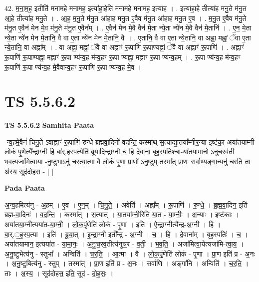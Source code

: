 \documentclass[17pt]{extarticle}
\begin{document}
42. म॒ना॒म॒ह॒ इतीति॑ मनामहे मनामह॒ इत्या॑हा॒हेति॑ मनामहे मनामह॒ इत्या॑ह । . इत्या॑हा॒हे तीत्या॑ह मनु॒ते म॑नु॒त आ॒हे तीत्या॑ह मनु॒ते । . आ॒ह॒ म॒नु॒ते म॑नु॒त आ॑हाह मनु॒त ए॒वैव म॑नु॒त आ॑हाह मनु॒त ए॒व । . म॒नु॒त ए॒वैव म॑नु॒ते म॑नु॒त ए॒वैन॑ मेन मे॒व म॑नु॒ते म॑नु॒त ए॒वैन᳚म् । . ए॒वैन॑ मेन मे॒वै वैन॑ मे॒ता न्ये॒ता न्ये॑न मे॒वै वैन॑ मे॒तानि॑ । . ए॒न॒ मे॒ता न्ये॒ता न्ये॑न मेन मे॒तानि॒ वै वा ए॒ता न्ये॑न मेन मे॒तानि॒ वै । . ए॒तानि॒ वै वा ए॒ता न्ये॒तानि॒ वा अह्ना॒ मह्नां॒ ॅवा ए॒ता न्ये॒तानि॒ वा अह्ना᳚म् । . वा अह्ना॒ मह्नां॒ ॅवै वा अह्नाꣳ॑ रू॒पाणि॑ रू॒पाण्यह्नां॒ ॅवै वा अह्नाꣳ॑ रू॒पाणि॑ । . अह्नाꣳ॑ रू॒पाणि॑ रू॒पाण्यह्ना॒ मह्नाꣳ॑ रू॒पा ण्य॑न्व॒ह म॑न्व॒हꣳ रू॒पा ण्यह्ना॒ मह्नाꣳ॑ रू॒पा ण्य॑न्व॒हम् । . रू॒पा ण्य॑न्व॒ह म॑न्व॒हꣳ रू॒पाणि॑ रू॒पा ण्य॑न्व॒ह मे॒वैवान्व॒हꣳ रू॒पाणि॑ रू॒पा ण्य॑न्व॒ह मे॒व । \newline
\pagebreak
{}

\section{ TS 5.5.6.2 }

\textbf{TS 5.5.6.2 } \newline
\textbf{Samhita Paata} \newline

-न्व॒हमे॒वैनं॑ चिनु॒ते ऽवाह्नाꣳ॑ रू॒पाणि॑ रुन्धे ब्रह्मवा॒दिनो॑ वदन्ति॒ कस्मा᳚थ् स॒त्याद्या॒तया᳚म्नीर॒न्या इष्ट॑का॒ अया॑तयाम्नी लोकं पृ॒णेत्यै᳚न्द्रा॒ग्नी हि बा॑र्.हस्प॒त्येति॑ ब्रूयादिन्द्रा॒ग्नी च॒ हि दे॒वानां॒ बृह॒स्पति॒श्चा-या॑तयामानो ऽनुच॒रव॑ती भव॒त्यजा॑मित्वाया -नु॒ष्टुभाऽनु॑ चरत्या॒त्मा वै लो॑कं पृ॒णा प्रा॒णो॑ ऽनु॒ष्टुप् तस्मा᳚त् प्रा॒णः सर्वा॒ण्यङ्गा॒न्यनु॑ चरति॒ ता अ॑स्य॒ सूद॑दोहस॒ - [  ] \newline

\textbf{Pada Paata} \newline

अ॒न्व॒हमित्य॑नु - अ॒हम् । ए॒व । ए॒न॒म् । चि॒नु॒ते॒ । अवेति॑ । अह्ना᳚म् । रू॒पाणि॑ । रु॒न्धे॒ । ब्र॒ह्म॒वा॒दिन॒ इति॑ ब्रह्म-वा॒दिनः॑ । व॒द॒न्ति॒ । कस्मा᳚त् । स॒त्यात् । या॒तया᳚म्नी॒रिति॑ या॒त - या॒म्नीः॒ । अ॒न्याः । इष्ट॑काः । अया॑तया॒म्नीत्यया॑त-या॒म्नी॒ । लो॒क॒पृं॒णेति॑ लोकं - पृ॒णा । इति॑ । ऐ॒न्द्रा॒ग्नीत्यै᳚न्द्र-अ॒ग्नी । हि । बा॒र्.॒ह॒स्प॒त्या । इति॑ । ब्रू॒या॒त् । इ॒न्द्रा॒ग्नी इती᳚न्द्र - अ॒ग्नी । च॒ । हि । दे॒वाना᳚म् । बृह॒स्पतिः॑ । च॒ । अया॑तयामान॒ इत्यया॑त - या॒मा॒नः॒ । अ॒नु॒च॒रव॒तीत्य॑नुच॒र - व॒ती॒ । भ॒व॒ति॒ । अजा॑मित्वा॒येत्यजा॑मि-त्वा॒य॒ । अ॒नु॒ष्टुभेत्य॑नु - स्तुभा᳚ । अन्विति॑ । च॒र॒ति॒ । आ॒त्मा । वै । लो॒क॒पृं॒णेति॑ लोकं - पृ॒णा । प्रा॒ण इति॑ प्र - अ॒नः । अ॒नु॒ष्टुबित्य॑नु - स्तुप् । तस्मा᳚त् । प्रा॒ण इति॑ प्र - अ॒नः । सर्वा॑णि । अङ्गा॑नि । अन्विति॑ । च॒र॒ति॒ । ताः । अ॒स्य॒ । सूद॑दोहस॒ इति॒ सूद॑ - दो॒ह॒सः॒ ।  \newline
\end{document}

